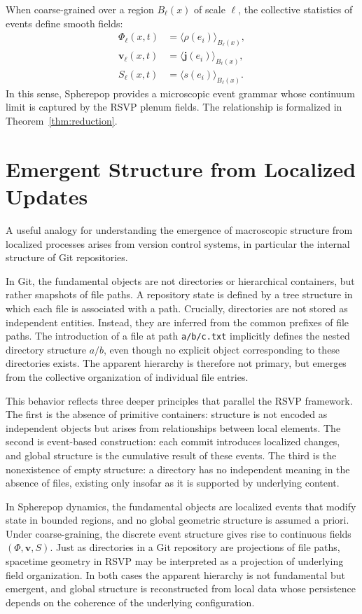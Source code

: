\documentclass[12pt,a4paper]{article}
\theoremstyle{plain}
\theoremstyle{definition}
\theoremstyle{remark}
\begin{document}
When coarse-grained over a region $B_\ell(x)$ of scale $\ell$, the
collective statistics of events define smooth fields:
\begin{align}
\Phi_\ell(x,t) &= \langle \rho(e_i) \rangle_{B_\ell(x)}, \\
\mathbf{v}_\ell(x,t) &= \langle \mathbf{j}(e_i) \rangle_{B_\ell(x)}, \\
S_\ell(x,t) &= \langle s(e_i) \rangle_{B_\ell(x)}.
\end{align}
In this sense, Spherepop provides a microscopic event grammar whose
continuum limit is captured by the RSVP plenum fields. The relationship
is formalized in Theorem~\ref{thm:reduction}.

\section{Emergent Structure from Localized Updates}
\label{sec:git}

A useful analogy for understanding the emergence of macroscopic
structure from localized processes arises from version control systems,
in particular the internal structure of Git repositories.

In Git, the fundamental objects are not directories or hierarchical
containers, but rather snapshots of file paths. A repository state is
defined by a tree structure in which each file is associated with a
path. Crucially, directories are not stored as independent entities.
Instead, they are inferred from the common prefixes of file paths. The
introduction of a file at path \texttt{a/b/c.txt} implicitly defines
the nested directory structure $a/b$, even though no explicit object
corresponding to these directories exists. The apparent hierarchy is
therefore not primary, but emerges from the collective organization of
individual file entries.

This behavior reflects three deeper principles that parallel the RSVP
framework. The first is the absence of primitive containers: structure
is not encoded as independent objects but arises from relationships
between local elements. The second is event-based construction: each
commit introduces localized changes, and global structure is the
cumulative result of these events. The third is the nonexistence of
empty structure: a directory has no independent meaning in the absence
of files, existing only insofar as it is supported by underlying
content.

In Spherepop dynamics, the fundamental objects are localized events
that modify state in bounded regions, and no global geometric structure
is assumed a priori. Under coarse-graining, the discrete event
structure gives rise to continuous fields $(\Phi,\mathbf{v},S)$. Just
as directories in a Git repository are projections of file paths,
spacetime geometry in RSVP may be interpreted as a projection of
underlying field organization. In both cases the apparent hierarchy is
not fundamental but emergent, and global structure is reconstructed
from local data whose persistence depends on the coherence of the
underlying configuration.
\end{document}
